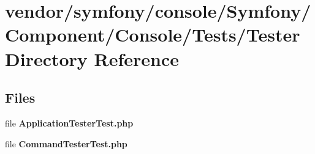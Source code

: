 \section{vendor/symfony/console/\+Symfony/\+Component/\+Console/\+Tests/\+Tester Directory Reference}
\label{dir_b3cebcabb2b7e1650628fe80a1fbd7fa}
\subsection*{Files}
\begin{DoxyCompactItemize}
\item 
file {\bf Application\+Tester\+Test.\+php}
\item 
file {\bf Command\+Tester\+Test.\+php}
\end{DoxyCompactItemize}
